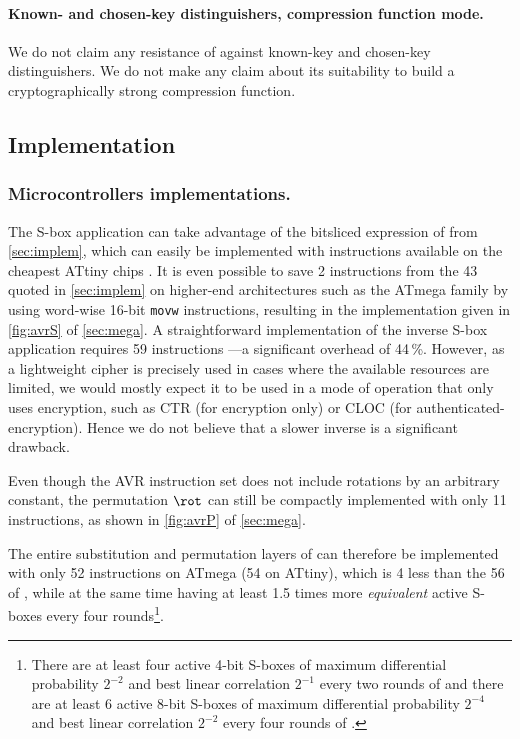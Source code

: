 \paragraph{Known- and chosen-key distinguishers, compression function mode.}
We do not claim any resistance of \fly against known-key and chosen-key distinguishers. We do not make any claim about its suitability
to build a cryptographically strong compression function.

\subsection{Implementation}
\label{sec:flyimplem}


\subsubsection{Microcontrollers implementations.}
The S-box application can take advantage of the bitsliced expression of \littlunOne from \autoref{sec:implem}, which can easily be implemented with instructions available on the cheapest ATtiny chips \cite{ATtiny}. It is even possible to save 2 instructions from
the 43 quoted in \autoref{sec:implem} on higher-end architectures such as the ATmega family \cite{ATmega} by using word-wise 16-bit \texttt{movw} instructions,
resulting in the implementation given in \autoref{fig:avrS} of \autoref{sec:mega}. A straightforward implementation of the inverse S-box application requires 59 instructions ---a significant overhead of 44\,\%.
However, as a lightweight cipher is precisely used in cases where the available resources are limited, we would mostly expect it to be used in a mode of operation that only uses encryption,
such as \eg \textsf{CTR} (for encryption only) or \textsf{CLOC} \cite{cloc} (for authenticated-encryption). Hence we do not believe that a slower inverse is a significant drawback.

Even though the AVR instruction set does not include rotations by an arbitrary constant, the permutation $\rot$ can still
be compactly implemented with only 11 instructions, as shown in \autoref{fig:avrP} of \autoref{sec:mega}.

The entire substitution and permutation layers of \fly can therefore be implemented with only 52 instructions on ATmega (54 on ATtiny), which is 4 less than the 56 of \pride \cite{pride},
while at the same time having at least 1.5 times more \emph{equivalent} active S-boxes every four rounds\footnote{There are at least four active 4-bit S-boxes of maximum differential probability $2^{-2}$ and
best linear correlation $2^{-1}$ every two rounds of \pride and there are at least 6 active 8-bit S-boxes of maximum differential probability $2^{-4}$ and best linear correlation $2^{-2}$ every
four rounds of \fly.}.

